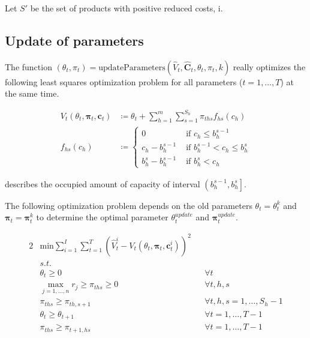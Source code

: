 Let $S'$ be the set of products with positive reduced costs, i. 

\subsection{Update of parameters}\label{sec-updateParameter}
The function $\left(\theta_t, \pi_t \right) = \text{updateParameters}\left(\hat{V}_t, \mathbf{\hat{C}}_t, \theta_t, \pi_t, k\right)$ really optimizes the following least squares optimization problem for all parameters ($t = 1, \dots, T$) at the same time.

\begin{align}
V_t(\theta_t, \mathbf{\pi}_t, \mathbf{c}_t) & \coloneqq \theta_t + \sum_{h=1}^{m}\sum_{s=1}^{S_h} \pi_{ths} f_{hs}(c_h) \\
f_{hs}(c_h) &\coloneqq 
\begin{cases}\label{def-f}
0 & \text{ if } c_h \leq b_h^{s-1}\\
c_h - b_h^{s-1} & \text{ if } b_h^{s-1} < c_h \leq b_h^s \\
b_h^s - b_h^{s-1} & \text{ if } b_h^s < c_h
\end{cases}
\end{align}

 describes the occupied amount of capacity of interval $\left(b_h^{s-1}, b_h^s\right]$.

The following optimization problem depends on the old parameters $\theta_t = \theta_t^k$ and $\mathbf{\pi}_t = \mathbf{\pi}_t^k$ to determine the optimal parameter $\theta_t^{update}$ and $\mathbf{\pi}_t^{update}$.

\begin{alignat}{2}
& \text{min} \sum_{i=1}^{I}\sum_{t=1}^{T} \left( \hat{V}_t^i - V_t(\theta_t, \mathbf{\pi}_t, \mathbf{c}_t^i) \right)^2 && \\
& s.t. && \\
& \theta_t \geq 0 && \forall t\\
& \max_{j=1, \dots, n} r_j \geq \pi_{ths} \geq 0 && \forall t, h, s\\
& \pi_{ths} \geq \pi_{th,s+1} && \forall t, h, s = 1, \dots, S_h-1\\
& \theta_t \geq \theta_{t+1} && \forall t = 1, \dots, T-1\\
& \pi_{ths} \geq \pi_{t+1,hs} && \forall t = 1, \dots, T-1
\end{alignat}

